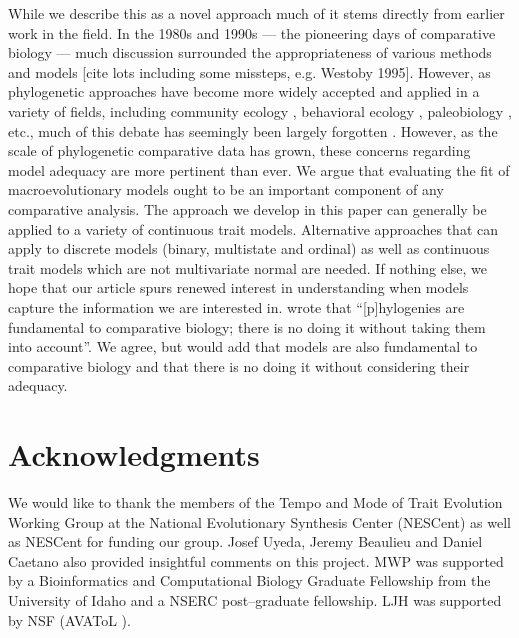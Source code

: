 \documentclass[12pt]{article}
\begin{document}
While we describe this as a novel approach much of it stems directly from earlier work in the field. In the 1980s and 1990s --- the pioneering days of comparative biology --- much discussion surrounded the appropriateness of various methods and models [cite lots including some missteps, e.g. Westoby 1995]. However, as phylogenetic approaches have become more widely accepted and applied in a variety of fields, including community ecology \citep{Green1993, AckerlyDonoghue1995, Webb2002, CB2009, PennellHarmon}, behavioral ecology \citep{something}, paleobiology \citep{something else}, etc., much of this debate has seemingly been largely forgotten \citep[but see][]{Losos2010}. However, as the scale of phylogenetic comparative data has grown, these concerns regarding model adequacy are more pertinent than ever. We argue that evaluating the fit of macroevolutionary models ought to be an important component of any comparative analysis. The approach we develop in this paper can generally be applied to a variety of continuous trait models. Alternative approaches that can apply to discrete models (binary, multistate and ordinal) as well as continuous trait models which are not multivariate normal are needed. If nothing else, we hope that our article spurs renewed interest in understanding when models capture the information we are interested in. \citet[][p. 14]{Felsenstein1985} wrote that ``[p]hylogenies are fundamental to comparative biology; there is no doing it without taking them into account''. We agree, but would add that models are also fundamental to comparative biology and that there is no doing it without considering their adequacy.


\section*{Acknowledgments}

We would like to thank the members of the Tempo and Mode of Trait Evolution Working Group at the National Evolutionary Synthesis Center (NESCent) as well as NESCent for funding our group. Josef Uyeda, Jeremy Beaulieu and Daniel Caetano also provided insightful comments on this project. MWP was supported by a Bioinformatics and Computational Biology Graduate Fellowship from the University of Idaho and a NSERC post--graduate fellowship. LJH was supported by NSF (AVAToL ).



\newpage


\end{document}
